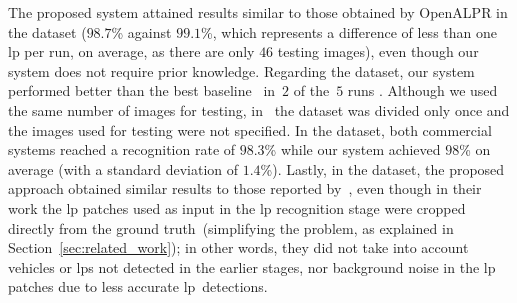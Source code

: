 The proposed system attained results similar to those obtained by OpenALPR in the \caltech dataset ($98.7$\% against $99.1$\%, which represents a difference of less than one \gls*{lp} per run, on average, as there are only $46$ testing images), even though our system does not require prior knowledge. Regarding the \englishlpd dataset, our system performed better than the best baseline~\citep{panahi2017accurate} in~$2$ of the~$5$ runs . Although we used the same number of images for testing, in~\citep{panahi2017accurate} the dataset was divided only once and the images used for testing were not specified. In the \stills dataset, both commercial systems reached a recognition rate of $98.3$\% while our system achieved $98$\% on average (with a standard deviation of $1.4$\%). 
Lastly, in the \aolp dataset, the proposed approach obtained similar results to those reported by~\cite{zhuang2018towards}, even though in their work the \gls*{lp} patches used as input in the \gls*{lp} recognition stage were cropped directly from the ground truth~(simplifying the problem, as explained in Section~\ref{sec:related_work}); in other words, they did not take into account vehicles or \glspl*{lp}  not detected in the earlier stages, nor background noise in the \gls*{lp} patches due to less accurate \gls*{lp}~detections.


